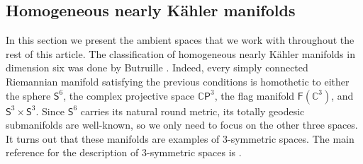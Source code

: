 \documentclass[11pt,a4paper,final]{amsart}
\newcommand{\C}{\mathbb{C}}
\theoremstyle{definition}
\begin{document}
	
\subsection{Homogeneous nearly Kähler manifolds}\label{subsec:homNK}
	
In this section we present the ambient spaces that we work with throughout the rest of this article.
The classification of homogeneous nearly Kähler manifolds in dimension six was done by Butruille \cite{Butruille}.
Indeed, every simply connected Riemannian manifold satisfying the previous conditions is homothetic to either the sphere $\mathsf{S}^{6}$, the complex projective space $\C\mathsf{P}^{3}$,  the flag manifold $\mathsf{F}(\C^{3})$, and $\mathsf{S}^{3}\times\mathsf{S}^{3}$.
Since $\mathsf{S}^{6}$ carries its natural round metric, its totally geodesic submanifolds are well-known, so we only need to focus on the other three spaces.
It turns out that these manifolds are examples of $3$-symmetric spaces.
The main reference for the description of $3$-symmetric spaces is \cite{GrayWolfI}.
	
\end{document}

